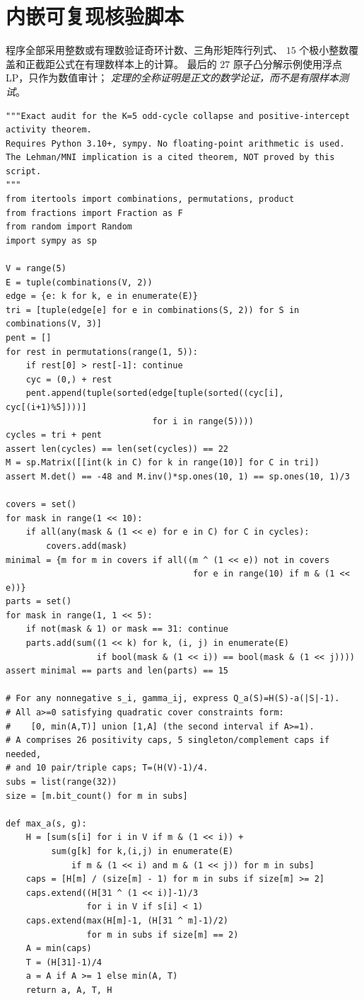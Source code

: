 \documentclass[11pt,a4paper]{ctexart}
\theoremstyle{remark}
\begin{document}
\section{内嵌可复现核验脚本}
程序全部采用整数或有理数验证奇环计数、三角形矩阵行列式、
$15$ 个极小整数覆盖和正截距公式在有理数样本上的计算。
最后的 $27$ 原子凸分解示例使用浮点 LP，只作为数值审计；
\emph{定理的全称证明是正文的数学论证，而不是有限样本测试}。
\begin{lstlisting}[caption={D2\_K5\_oddcycle\_positive\_active\_audit.py}]
"""Exact audit for the K=5 odd-cycle collapse and positive-intercept activity theorem.
Requires Python 3.10+, sympy. No floating-point arithmetic is used.
The Lehman/MNI implication is a cited theorem, NOT proved by this script.
"""
from itertools import combinations, permutations, product
from fractions import Fraction as F
from random import Random
import sympy as sp

V = range(5)
E = tuple(combinations(V, 2))
edge = {e: k for k, e in enumerate(E)}
tri = [tuple(edge[e] for e in combinations(S, 2)) for S in combinations(V, 3)]
pent = []
for rest in permutations(range(1, 5)):
    if rest[0] > rest[-1]: continue
    cyc = (0,) + rest
    pent.append(tuple(sorted(edge[tuple(sorted((cyc[i], cyc[(i+1)%5])))]
                             for i in range(5))))
cycles = tri + pent
assert len(cycles) == len(set(cycles)) == 22
M = sp.Matrix([[int(k in C) for k in range(10)] for C in tri])
assert M.det() == -48 and M.inv()*sp.ones(10, 1) == sp.ones(10, 1)/3

covers = set()
for mask in range(1 << 10):
    if all(any(mask & (1 << e) for e in C) for C in cycles):
        covers.add(mask)
minimal = {m for m in covers if all((m ^ (1 << e)) not in covers
                                     for e in range(10) if m & (1 << e))}
parts = set()
for mask in range(1, 1 << 5):
    if not(mask & 1) or mask == 31: continue
    parts.add(sum((1 << k) for k, (i, j) in enumerate(E)
                  if bool(mask & (1 << i)) == bool(mask & (1 << j))))
assert minimal == parts and len(parts) == 15

# For any nonnegative s_i, gamma_ij, express Q_a(S)=H(S)-a(|S|-1).
# All a>=0 satisfying quadratic cover constraints form:
#    [0, min(A,T)] union [1,A] (the second interval if A>=1).
# A comprises 26 positivity caps, 5 singleton/complement caps if needed,
# and 10 pair/triple caps; T=(H(V)-1)/4.
subs = list(range(32))
size = [m.bit_count() for m in subs]

def max_a(s, g):
    H = [sum(s[i] for i in V if m & (1 << i)) +
         sum(g[k] for k,(i,j) in enumerate(E)
             if m & (1 << i) and m & (1 << j)) for m in subs]
    caps = [H[m] / (size[m] - 1) for m in subs if size[m] >= 2]
    caps.extend((H[31 ^ (1 << i)]-1)/3
                for i in V if s[i] < 1)
    caps.extend(max(H[m]-1, (H[31 ^ m]-1)/2)
                for m in subs if size[m] == 2)
    A = min(caps)
    T = (H[31]-1)/4
    a = A if A >= 1 else min(A, T)
    return a, A, T, H


\end{lstlisting}
\end{document}

